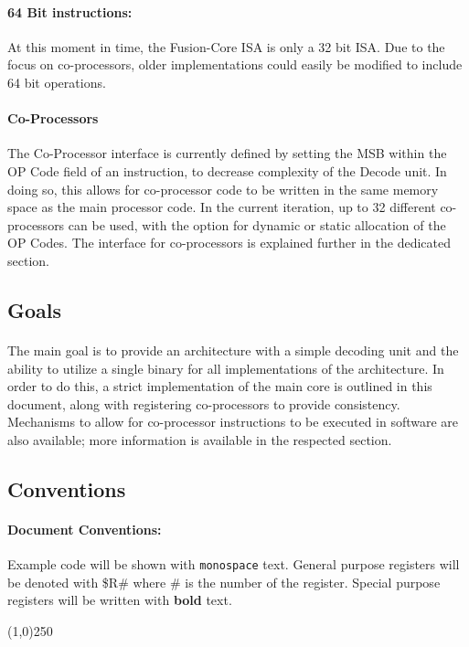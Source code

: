 \documentclass[letterpaper, 11pt]{article}
\begin{document}
\paragraph{64 Bit instructions:}At this moment in time, the Fusion-Core ISA is only a 32 bit ISA. Due to the focus on co-processors,
older implementations could easily be modified to include 64 bit operations.
\paragraph{Co-Processors}The Co-Processor interface is currently defined by setting the MSB within the OP Code field of 
an instruction, to decrease complexity of the Decode unit. In doing so, this allows for co-processor code to be written in the same memory space as the main processor code. In the current iteration, up to 32 different co-processors can be used, with the option for dynamic or static allocation of the OP Codes. The interface for co-processors is explained further in the dedicated section.

\subsection{Goals}
\paragraph{}The main goal is to provide an architecture with a simple decoding unit and the ability to utilize a single binary for all implementations of the architecture.
In order to do this, a strict implementation of the main core is outlined in this document, along with registering co-processors to provide consistency. 
Mechanisms to allow for co-processor instructions to be executed in software are also available; more information is available in the respected section.
\subsection{Conventions}
\paragraph{Document Conventions:}Example code will be shown with \texttt{monospace} text. General purpose registers will be denoted with
\$R\# where \# is the number of the register. Special purpose registers will be written with \textbf{bold} text.
\begin{center}
	\line(1,0){250}
\end{center}
\clearpage
\end{document}
